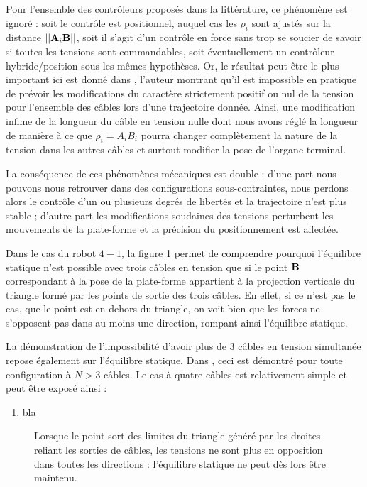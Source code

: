 Pour l'ensemble des contrôleurs proposés dans la littérature, ce phénomène est ignoré : soit le contrôle est positionnel, auquel cas les $\rho_i$ sont ajustés sur la distance $||{\bf A}_i {\bf B}||$, soit il s'agit d'un contrôle en force sans trop se soucier de savoir si toutes les tensions sont commandables, soit éventuellement un contrôleur hybride/position sous les mêmes hypothèses. Or, le r\'esultat
peut-\^etre le plus important ici est donn\'e dans \cite{merlet2014check}, l'auteur 
montrant qu'il est impossible en pratique de pr\'evoir les modifications du 
caract\`ere strictement positif ou nul de la tension pour l'ensemble des 
c\^ables lors d'une trajectoire donn\'ee. Ainsi, une modification infime de la 
longueur du c\^able en tension nulle dont nous avons r\'egl\'e la longueur de 
mani\`ere \`a ce que $\rho_i = A_iB_i$ pourra changer compl\`etement la nature 
de la tension dans les autres c\^ables et surtout modifier la pose de l'organe 
terminal.

La cons\'equence de ces ph\'enom\`enes m\'ecaniques est double : d'une part
nous pouvons nous retrouver dans des configurations sous-contraintes, nous
perdons alors le contr\^ole d'un ou plusieurs degr\'es de libert\'es et la
trajectoire n'est plus stable ; d'autre part les modifications soudaines des
tensions perturbent les mouvements de la plate-forme et la pr\'ecision du
positionnement est affect\'ee.

Dans le cas du robot $4-1$, la figure \ref{chap01:fig0000} permet de comprendre pourquoi l'équilibre statique n'est possible avec trois câbles en tension que si le point ${\bf B}$ correspondant à la pose de la plate-forme appartient à la projection verticale du triangle formé par les points de sortie des trois câbles. En effet, si ce n'est pas le cas, que le point est en dehors du triangle, on voit bien que les forces ne s'opposent pas dans au moins une direction, rompant ainsi l'équilibre statique.

La démonstration de l'impossibilité d'avoir plus de $3$ câbles en tension simultanée repose également sur l'équilibre statique. Dans \cite{merlet2012}, ceci est démontré pour toute configuration à $N > 3$ câbles. Le cas à quatre câbles est relativement simple et peut être exposé ainsi :
\begin{enumerate}
 \item bla
\end{enumerate}

\begin{figure}[!ht]
  \centering
    \def\svgwidth{.65\linewidth}
  
    \caption{\footnotesize{Lorsque le point sort des limites du triangle généré par les droites reliant les sorties de câbles, les tensions ne sont plus en opposition dans toutes les directions : l'équilibre statique ne peut dès lors être maintenu.}}
\label{chap01:fig0000}
\end{figure}

